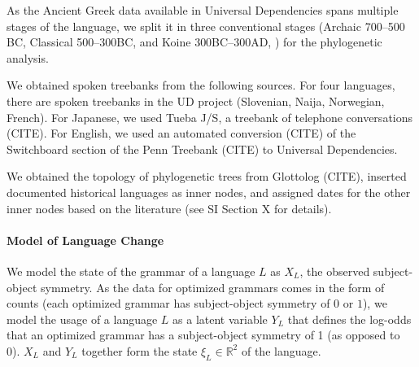 \documentclass[11pt,a4paper]{article}
\begin{document}
As the Ancient Greek data available in Universal Dependencies spans multiple stages of the language, we split it in three conventional stages (Archaic 700--500 BC, Classical 500--300BC, and Koine 300BC--300AD, \citet{taylor1994change}) for the phylogenetic analysis. 

We obtained spoken treebanks from the following sources.
For four languages, there are spoken treebanks in the UD project (Slovenian, Naija, Norwegian, French). For Japanese, we used Tueba J/S, a treebank of telephone conversations (CITE). For English, we used an automated conversion (CITE) of the Switchboard section of the Penn Treebank (CITE) to Universal Dependencies.

We obtained the topology of phylogenetic trees from Glottolog (CITE), inserted documented historical languages as inner nodes, and assigned dates for the other inner nodes based on the literature (see SI Section X for details).

\paragraph{Model of Language Change}



We model the state of the grammar of a language $L$ as $X_L$, the observed subject-object symmetry.
As the data for optimized grammars comes in the form of counts (each optimized grammar has subject-object symmetry of $0$ or $1$), we model the usage of a language $L$ as a latent variable $Y_L$ that defines the log-odds that an optimized grammar has a subject-object symmetry of 1 (as opposed to 0).
$X_L$ and $Y_L$ together form the state $\xi_L \in \mathbb{R}^2$  of the language.

\end{document}
